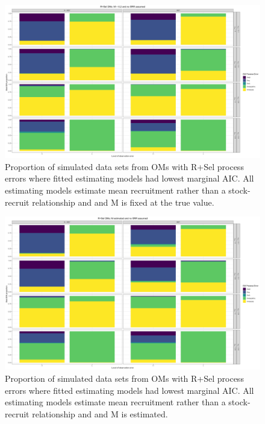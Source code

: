 \documentclass[
  12pt,
]{article}
\begin{document}
\begin{landscape}
\begin{figure}
\caption{Proportion of simulated data sets from OMs with R+Sel process errors where fitted estimating models had lowest marginal AIC. All estimating models estimate mean recruitment rather than a stock-recruit relationship and and M is fixed at the true value.} \label{Sel_om_proportion_best_aic_R_MF}
\begin{center}
\includegraphics[width = \textwidth]{Sel_om_proportion_best_aic_R_MF.png}
\end{center}
\end{figure}
\end{landscape}

\begin{landscape}
\begin{figure}
\caption{Proportion of simulated data sets from OMs with R+Sel process errors where fitted estimating models had lowest marginal AIC. All estimating models estimate mean recruitment rather than a stock-recruit relationship and and M is estimated.} \label{Sel_om_proportion_best_aic_R_ME}
\begin{center}
\includegraphics[width = \textwidth]{Sel_om_proportion_best_aic_R_ME.png}
\end{center}
\end{figure}
\end{landscape}
\end{document}
